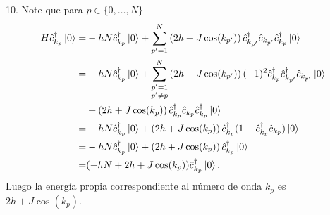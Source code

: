 \documentclass{article}
\begin{document}
10. Note que para $p\in\{0,\dots,N\}$
\begin{align}
\begin{split}
H\hat{c}_{k_p}^\dagger\ket{0}=&-hN\hat{c}_{k_p}^\dagger\ket{0}+\sum_{p'=1}^{N}\left(2h+J\cos(k_{p'}) \right)\hat{c}_{k_{p'}}^\dagger\hat{c}_{k_{p'}}\hat{c}_{k_p}^\dagger\ket{0}\\
=&-hN\hat{c}_{k_p}^\dagger\ket{0}+\sum_{\substack{p'=1\\p'\neq p}}^{N}\left(2h+J\cos(k_{p'}) \right)(-1)^2\hat{c}_{k_p}^\dagger\hat{c}_{k_{p'}}^\dagger\hat{c}_{k_{p'}}\ket{0}\\
&+\left(2h+J\cos(k_p) \right)\hat{c}_{k_p}^\dagger\hat{c}_{k_p}\hat{c}_{k_p}^\dagger\ket{0}\\
=&-hN\hat{c}_{k_p}^\dagger\ket{0}+\left(2h+J\cos(k_p) \right)\hat{c}_{k_p}^\dagger(1-\hat{c}_{k_p}^\dagger \hat{c}_{k_p})\ket{0}\\
=&-hN\hat{c}_{k_p}^\dagger\ket{0}+\left(2h+J\cos(k_p) \right)\hat{c}_{k_p}^\dagger\ket{0}\\
=&\qty(-hN+2h+J\cos(k_p))\hat{c}_{k_p}^\dagger\ket{0}.\\
\end{split}
\end{align}
Luego la energía propia correspondiente al número de onda $k_p$ es $2h+J\cos(k_p)$.
\end{document}
